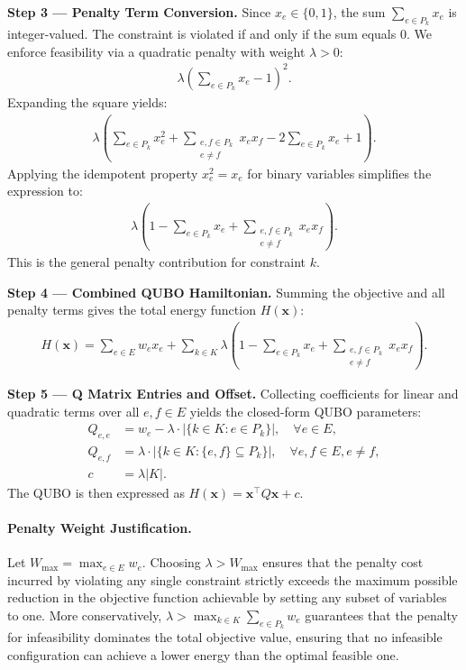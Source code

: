 \documentclass[12pt]{article}
\begin{document}
\textbf{Step 3 --- Penalty Term Conversion.} Since $x_e \in \{0,1\}$, the sum $\sum_{e \in P_k} x_e$ is integer-valued. The constraint is violated if and only if the sum equals $0$. We enforce feasibility via a quadratic penalty with weight $\lambda > 0$:
\begin{align}
    \lambda \left( \sum_{e \in P_k} x_e - 1 \right)^2.
\end{align}
Expanding the square yields:
\begin{align}
    \lambda \left( \sum_{e \in P_k} x_e^2 + \sum_{\substack{e,f \in P_k \\ e \neq f}} x_e x_f - 2 \sum_{e \in P_k} x_e + 1 \right).
\end{align}
Applying the idempotent property $x_e^2 = x_e$ for binary variables simplifies the expression to:
\begin{align}
    \lambda \left( 1 - \sum_{e \in P_k} x_e + \sum_{\substack{e,f \in P_k \\ e \neq f}} x_e x_f \right).
\end{align}
This is the general penalty contribution for constraint $k$.

\textbf{Step 4 --- Combined QUBO Hamiltonian.} Summing the objective and all penalty terms gives the total energy function $H(\mathbf{x})$:
\begin{align}
    H(\mathbf{x}) = \sum_{e \in E} w_e x_e + \sum_{k \in K} \lambda \left( 1 - \sum_{e \in P_k} x_e + \sum_{\substack{e,f \in P_k \\ e \neq f}} x_e x_f \right).
\end{align}

\textbf{Step 5 --- Q Matrix Entries and Offset.} Collecting coefficients for linear and quadratic terms over all $e, f \in E$ yields the closed-form QUBO parameters:
\begin{align}
    Q_{e,e} &= w_e - \lambda \cdot |\{k \in K : e \in P_k\}|, \quad \forall e \in E, \\
    Q_{e,f} &= \lambda \cdot |\{k \in K : \{e,f\} \subseteq P_k\}|, \quad \forall e,f \in E, e \neq f, \\
    c &= \lambda |K|.
\end{align}
The QUBO is then expressed as $H(\mathbf{x}) = \mathbf{x}^\top Q \mathbf{x} + c$.

\paragraph{Penalty Weight Justification.}
Let $W_{\max} = \max_{e \in E} w_e$. Choosing $\lambda > W_{\max}$ ensures that the penalty cost incurred by violating any single constraint strictly exceeds the maximum possible reduction in the objective function achievable by setting any subset of variables to one. More conservatively, $\lambda > \max_{k \in K} \sum_{e \in P_k} w_e$ guarantees that the penalty for infeasibility dominates the total objective value, ensuring that no infeasible configuration can achieve a lower energy than the optimal feasible one.
\end{document}
